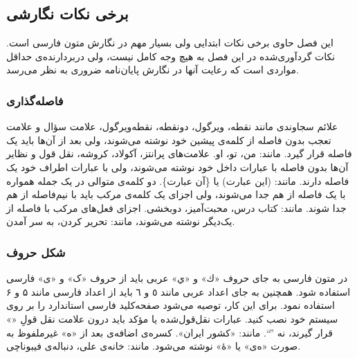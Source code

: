 \subsection{برخی نکات نگارشی}

این فصل حاوی برخی نکات ابتدایی ولی بسیار مهم در نگارش متون فارسی است. 
نکات گردآوری‌شده در این فصل به‌ هیچ‌ وجه کامل نیست، 
ولی دربردارنده‌ی حداقل مواردی است که رعایت آنها در نگارش پایان‌نامه ضروری به نظر می‌رسد.

\subsubsection{فاصله‌گذاری}


علائم سجاوندی مانند نقطه، ویرگول، دونقطه، نقطه‌ویرگول، علامت سؤال و علامت تعجب %
بدون فاصله از کلمه‌ی پیشین خود نوشته می‌شوند، ولی بعد از آن‌ها باید یک فاصله‌ قرار گیرد. مانند: من، تو، او.
علامت‌های پرانتز، آکولاد، کروشه، نقل قول و نظایر آن‌ها بدون فاصله با عبارات داخل خود نوشته می‌شوند، ولی با عبارات اطراف خود یک فاصله دارند. مانند: (این عبارت) یا \{آن عبارت\}.
دو کلمه‌ی متوالی در یک جمله همواره با یک فاصله از هم جدا می‌شوند، ولی اجزای یک کلمه‌ی مرکب باید با نیم‌فاصله‌‌
 از هم جدا شوند. مانند: کتاب درس، محبت‌آمیز، دوبخشی.
 اجزای فعل‌های مرکب با فاصله از یک‌دیگر نوشته می‌شوند، مانند: تحریر کردن، به سر آمدن.


\subsubsection{شکل حروف}


در متون فارسی به جای حروف «ك» و «ي» عربی باید از حروف «ک» و «ی» فارسی استفاده شود. همچنین به جای اعداد عربی مانند ٥ و ٦ باید از اعداد فارسی مانند ۵ و ۶ استفاده نمود. 
برای این کار، توصیه می‌شود صفحه‌کلید‌ فارسی استاندارد را بر روی سیستم خود نصب کنید.
عبارات نقل‌قول‌شده یا مؤکد باید درون علامت نقل قولِ «» قرار گیرند، نه ''``. مانند: «کشور ایران».
کسره‌ی اضافه‌ی بعد از «ه» غیرملفوظ به صورت «ه‌ی» یا «هٔ» نوشته می‌شود. مانند: خانه‌ی علی، دنباله‌ی فیبوناچی.

